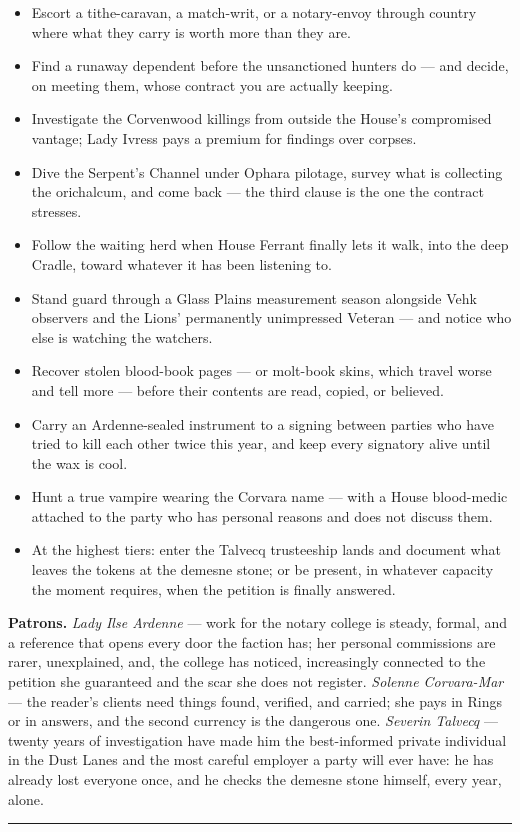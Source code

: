 \begin{itemize}
    \item Escort a tithe-caravan, a match-writ, or a notary-envoy through country where what they carry is worth more than they are.
    \item Find a runaway dependent before the unsanctioned hunters do --- and decide, on meeting them, whose contract you are actually keeping.
    \item Investigate the Corvenwood killings from outside the House's compromised vantage; Lady Ivress pays a premium for findings over corpses.
    \item Dive the Serpent's Channel under Ophara pilotage, survey what is collecting the orichalcum, and come back --- the third clause is the one the contract stresses.
    \item Follow the waiting herd when House Ferrant finally lets it walk, into the deep Cradle, toward whatever it has been listening to.
    \item Stand guard through a Glass Plains measurement season alongside Vehk observers and the Lions' permanently unimpressed Veteran --- and notice who else is watching the watchers.
    \item Recover stolen blood-book pages --- or molt-book skins, which travel worse and tell more --- before their contents are read, copied, or believed.
    \item Carry an Ardenne-sealed instrument to a signing between parties who have tried to kill each other twice this year, and keep every signatory alive until the wax is cool.
    \item Hunt a true vampire wearing the Corvara name --- with a House blood-medic attached to the party who has personal reasons and does not discuss them.
    \item At the highest tiers: enter the Talvecq trusteeship lands and document what leaves the tokens at the demesne stone; or be present, in whatever capacity the moment requires, when the petition is finally answered.
\end{itemize}

\textbf{Patrons.} \textit{Lady Ilse Ardenne} --- work for the notary college is steady, formal, and a reference that opens every door the faction has; her personal commissions are rarer, unexplained, and, the college has noticed, increasingly connected to the petition she guaranteed and the scar she does not register. \textit{Solenne Corvara-Mar} --- the reader's clients need things found, verified, and carried; she pays in Rings or in answers, and the second currency is the dangerous one. \textit{Severin Talvecq} --- twenty years of investigation have made him the best-informed private individual in the Dust Lanes and the most careful employer a party will ever have: he has already lost everyone once, and he checks the demesne stone himself, every year, alone.

\medskip\hrule\medskip
